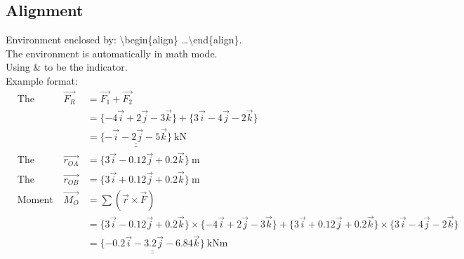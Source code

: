 \documentclass[10pt,a4paper,fleqn]{article}
\def\bslash{\textbackslash} %
\begin{document}
\subsection{Alignment}
Environment enclosed by: \bslash begin\{align\} \dots \bslash end\{align\}.\\
The environment is automatically in math mode.\\
Using \& to be the indicator.\\
Example format:
\setlength{\mathindent}{0mm}
\begin{align*}
&\text{The resultant force:} &\overrightarrow{F_R} &= \overrightarrow{F_1} + \overrightarrow{F_2}\\
&&&= \{-4\vec{i}+2\vec{j}-3\vec{k}\} + \{3\vec{i}-4\vec{j}-2\vec{k} \} \\
&&&= \underline{ \underline{ \{-\vec{i}-2\vec{j}-5\vec{k}\} }} \ \mathrm{kN} \\[0.5cm]
&\text{The distance of OA:} &\overrightarrow{r_{OA}} &= \{3\vec{i}-0.12\vec{j}+0.2\vec{k} \} \  \mathrm{m} \\
&\text{The distance of OB:} &\overrightarrow{r_{OB}} &= \{3\vec{i}+0.12\vec{j}+0.2\vec{k} \} \  \mathrm{m} \\
&\text{Moment at point O:} &\overrightarrow{M_O} &= \sum{ (\vec{r} \times \vec{F} ) }\\
&&&= \{3\vec{i}-0.12\vec{j}+0.2\vec{k} \}  \times \{-4\vec{i}+2\vec{j}-3\vec{k} \} 
   + \{3\vec{i}+0.12\vec{j}+0.2\vec{k} \} \times \{3\vec{i}-4\vec{j}-2\vec{k} \} \\
&&&= \underline{\underline{ \{ -0.2\vec{i} - 3.2\vec{j} - 6.84\vec{k} \} }}\  \mathrm{kNm}
\end{align*}
\end{document}

